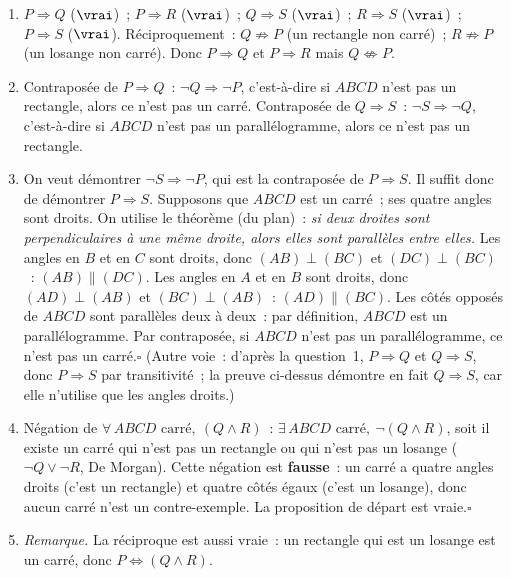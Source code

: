 \begin{enumerate}
  \item $P\Rightarrow Q$ ($\vrai$)~; $P\Rightarrow R$ ($\vrai$)~;
        $Q\Rightarrow S$ ($\vrai$)~; $R\Rightarrow S$ ($\vrai$)~; $P\Rightarrow S$ ($\vrai$).
        R\'eciproquement~: $Q\not\Rightarrow P$ (un rectangle non carr\'e)~;
        $R\not\Rightarrow P$ (un losange non carr\'e).
        Donc $P\Rightarrow Q$ et $P\Rightarrow R$ mais $Q\not\Leftrightarrow P$.
  \item Contrapos\'ee de $P\Rightarrow Q$~: $\lnot Q\Rightarrow\lnot P$, c'est-\`a-dire
        \og si $ABCD$ n'est pas un rectangle, alors ce n'est pas un carr\'e\fg.
        Contrapos\'ee de $Q\Rightarrow S$~: $\lnot S\Rightarrow\lnot Q$, c'est-\`a-dire
        \og si $ABCD$ n'est pas un parall\'elogramme, alors ce n'est pas un rectangle\fg.
  \item On veut d\'emontrer $\lnot S\Rightarrow\lnot P$, qui est la contrapos\'ee de $P\Rightarrow S$.
        Il suffit donc de d\'emontrer $P\Rightarrow S$.
        Supposons que $ABCD$ est un carr\'e~; ses quatre angles sont droits.
        On utilise le th\'eor\`eme (du plan)~: \emph{si deux droites sont perpendiculaires \`a une
        m\^eme droite, alors elles sont parall\`eles entre elles.}
        Les angles en $B$ et en $C$ sont droits, donc $(AB)\perp(BC)$ et $(DC)\perp(BC)$~:
        $(AB)\parallel(DC)$.
        Les angles en $A$ et en $B$ sont droits, donc $(AD)\perp(AB)$ et $(BC)\perp(AB)$~:
        $(AD)\parallel(BC)$.
        Les c\^ot\'es oppos\'es de $ABCD$ sont parall\`eles deux \`a deux~:
        par d\'efinition, $ABCD$ est un parall\'elogramme.
        Par contrapos\'ee, si $ABCD$ n'est pas un parall\'elogramme, ce n'est pas un carr\'e.\hfill$\square$
        (Autre voie~: d'apr\`es la question~1, $P\Rightarrow Q$ et $Q\Rightarrow S$, donc
        $P\Rightarrow S$ par transitivit\'e~; la preuve ci-dessus d\'emontre en fait
        $Q\Rightarrow S$, car elle n'utilise que les angles droits.)
  \item N\'egation de $\forall\,ABCD\text{ carr\'e},\ (Q\land R)$~:
        $\exists\,ABCD\text{ carr\'e},\ \lnot(Q\land R)$, soit
        \og il existe un carr\'e qui n'est pas un rectangle ou qui n'est pas un losange\fg
        ($\lnot Q\lor\lnot R$, De Morgan).
        Cette n\'egation est \textbf{fausse}~: un carr\'e a quatre angles droits
        (c'est un rectangle) et quatre c\^ot\'es \'egaux (c'est un losange),
        donc aucun carr\'e n'est un contre-exemple. La proposition de d\'epart est vraie.\hfill$\square$
  \item[] \textit{Remarque.} La r\'eciproque est aussi vraie~: un rectangle qui est un losange
        est un carr\'e, donc $P\Leftrightarrow(Q\land R)$.
\end{enumerate}

